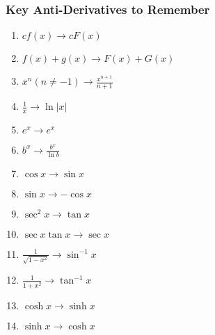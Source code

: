 \documentclass[10pt,a4paper]{article}
\begin{document}
	\subsubsection{Key Anti-Derivatives to Remember}
		\begin{enumerate}
				\item $cf(x) \rightarrow cF(x)$
				\item $f(x) + g(x) \rightarrow F(x) + G(x)$
				\item $x^{n}(n \neq -1) \rightarrow \frac{x^{n+1}}{n+1}$
				\item $\frac{1}{x} \rightarrow \ln{|x|}$
				\item $e^{x} \rightarrow e^{x}$
				\item $b^{x} \rightarrow \frac{b^{x}}{\ln{b}}$
				\item $\cos{x} \rightarrow \sin{x} $
				\item $\sin{x} \rightarrow -\cos{x}$
				\item $\sec^{2}{x} \rightarrow \tan{x}$
				\item $\sec{x} \tan{x} \rightarrow \sec{x}$
				\item $\frac{1}{\sqrt{1-x^{2}}} \rightarrow \sin^{-1}{x}$
				\item $\frac{1}{1+x^{2}} \rightarrow \tan^{-1}{x}$
				\item $\cosh{x} \rightarrow \sinh{x}$
				\item $\sinh{x} \rightarrow \cosh{x}$
		\end{enumerate}


 


	
\end{document}
